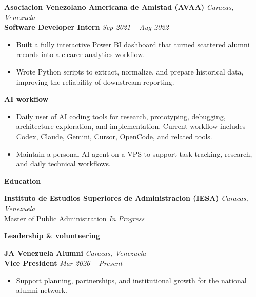 \documentclass[11pt]{article}
\begin{document}
\vspace{10pt}
\textbf{Asociacion Venezolano Americana de Amistad (AVAA)} \hfill \textit{Caracas, Venezuela} \\
\textbf{Software Developer Intern} \hfill \textit{Sep 2021 -- Aug 2022}
\begin{itemize}
    \item Built a fully interactive Power BI dashboard that turned scattered alumni records into a clearer analytics workflow.
    \item Wrote Python scripts to extract, normalize, and prepare historical data, improving the reliability of downstream reporting.
\end{itemize}
\vspace{8pt}
\begin{center}
    \textbf{AI workflow}
\end{center}
\vspace{-4pt}
\begin{itemize}
    \item Daily user of AI coding tools for research, prototyping, debugging, architecture exploration, and implementation. Current workflow includes Codex, Claude, Gemini, Cursor, OpenCode, and related tools.
    \item Maintain a personal AI agent on a VPS to support task tracking, research, and daily technical workflows.
\end{itemize}
\vspace{8pt}
\begin{center}
    \textbf{Education}
\end{center}
\vspace{-4pt}
\textbf{Instituto de Estudios Superiores de Administracion (IESA)} \hfill \textit{Caracas, Venezuela} \\
Master of Public Administration \hfill \textit{In Progress}
\vspace{8pt}
\begin{center}
    \textbf{Leadership \& volunteering}
\end{center}
\vspace{-4pt}
\textbf{JA Venezuela Alumni} \hfill \textit{Caracas, Venezuela} \\
\textbf{Vice President} \hfill \textit{Mar 2026 -- Present}
\begin{itemize}
    \item Support planning, partnerships, and institutional growth for the national alumni network.
\end{itemize}
\vspace{10pt}
\end{document}
